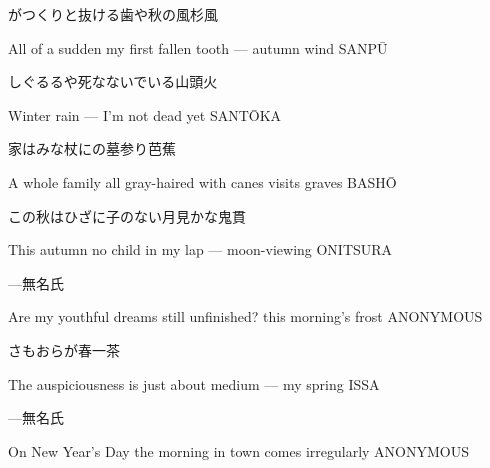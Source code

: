 \begin{haiku}
    {\FH がつくりと抜ける歯や秋の風}\hfill{\FH 杉風}

    \vin{} All of a sudden
    \vin{} \vin{} my first fallen tooth ---
    \vin{} \vin{} \vin{} autumn wind \hspace{\fill} SANP\={U}
\end{haiku}

\begin{haiku}
    {\FH しぐるるや死なないでいる}\hfill{\FH 山頭火}

    \vin{} Winter rain ---
    \vin{} \vin{} I'm not dead yet \hspace{\fill} SANT\={O}KA
\end{haiku}

\begin{haiku}
    {\FH 家はみな杖にの墓参り}\hfill{\FH 芭蕉}

    \vin{} A whole family
    \vin{} \vin{} all gray-haired with canes
    \vin{} \vin{} \vin{} visits graves \hspace{\fill} BASH\={O}
\end{haiku}

\begin{haiku}
    {\FH この秋はひざに子のない月見かな}\hfill{\FH 鬼貫}

    \vin{} This autumn
    \vin{} \vin{} no child in my lap ---
    \vin{} \vin{} \vin{} moon-viewing \hspace{\fill} ONITSURA
\end{haiku}

\begin{haiku}
    {---}\hfill{\FH 無名氏}

    \vin{} Are my youthful dreams
    \vin{} \vin{} still unfinished?
    \vin{} \vin{} \vin{} this morning's frost \hspace{\fill} ANONYMOUS
\end{haiku}

\begin{haiku}
    {\FH {}さもおらが春}\hfill{\FH 一茶}

    \vin{} The auspiciousness
    \vin{} \vin{} is just about medium ---
    \vin{} \vin{} \vin{} my spring \hspace{\fill} ISSA
\end{haiku}

\begin{haiku}
    {---}\hfill{\FH 無名氏}

    \vin{} On New Year's Day
    \vin{} \vin{} the morning in town
    \vin{} \vin{} \vin{} comes irregularly \hspace{\fill} ANONYMOUS
\end{haiku}


